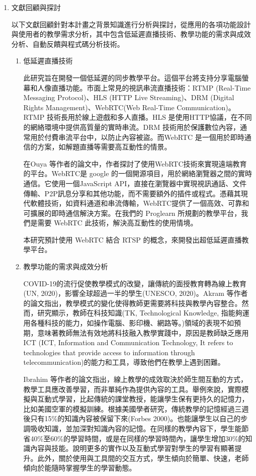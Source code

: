 \documentclass[12pt]{article}
\begin{document}
\begin{enumerate}
  \item 文獻回顧與探討
    \par 以下文獻回顧針對本計畫之背景知識進行分析與探討，從應用的各項功能設計與使用者的教學需求分析，其中包含低延遲直播技術、教學功能的需求與成效分析、自動反饋與程式碼分析技術。
    \begin{enumerate}
      \setlength{\parindent}{2em}
      \item 低延遲直播技術
        \par 此研究旨在開發一個低延遲的同步教學平台。這個平台將支持分享電腦螢幕和人像直播功能。市面上常見的視訊串流直播技術：RTMP (Real-Time Messaging Protocol)、HLS (HTTP Live Streaming)、DRM (Digital Rights Management)、WebRTC(Web Real-Time Communication)。RTMP 技術長用於線上遊戲和多人直播。HLS 是使用HTTP協議，在不同的網絡環境中提供高質量的實時串流。DRM 技術用於保護數位內容，通常用於付費串流平台中，以防止內容被盜。而WebRTC 是一個用於即時通信的方案，如解題直播等需要高互動性的情景。
        \par 在Ouya %
        等作者的論文中\cite{ref13}，作者探討了使用WebRTC技術來實現遠端教育的平台。WebRTC是 google 的一個開源項目，用於網絡瀏覽器之間的實時通信。它使用一個JavaScript API，直接在瀏覽器中實現視訊通話、文件傳輸、P2P訊息分享和其他功能，而不需要額外的插件或程式。憑藉其現代軟體技術，如資料通道和串流傳輸，WebRTC提供了一個高效、可靠和可擴展的即時通信解決方案。在我們的 Proglearn 所規劃的教學平台，我們是需要 WebRTC 此技術，解決高互動性的使用情境。
        \par 本研究預計使用 WebRTC 結合 RTSP 的概念，來開發出超低延遲直播教學平台。
      \item 教學功能的需求與成效分析
        \par COVID-19的流行促使教學模式的改變，讓傳統的面授教育轉為線上教育(UN, 2020)\cite{ref8}，影響全球超過一半的學生(UNESCO, 2020)\cite{ref9}。Akram %
        等作者的論文\cite{ref15}指出，教學模式的變化使得教師更需要將科技與教學內容整合。然而，研究顯示，教師在科技知識(TK, Technological Knowledge, 指能夠運用各種科技的能力，如操作電腦、影印機、網路等。)\cite{ref10}領域的表現不如預期，意味著教師無法有效地將科技融入教學實踐中，原因是教師缺乏應用ICT (ICT, Information and Communication Technology, It refers to technologies that provide access to information through telecommunication)\cite{ref11}的能力和工具，導致他們在教學上遇到困難。
        \par Ibrahim %
        等作者的論文\cite{ref14}指出，線上教學的成效取決於師生間互動的方式，教學工具應改善學習，而非單純作為提供內容的工具。舉例來說，實際模擬與互動式學習，比起傳統的課堂教授，能讓學生保有更持久的記憶力，比如美國空軍的模擬訓練。根據美國學者研究，傳統教學的記憶經過三週後只有15\%的知識內容被保留下來(Forbes 2000)\cite{ref12}。也能讓學生以自己的步調吸收知識，並加深對知識內容的記憶。在同樣的教學內容下，學生能節省40\%至60\%的學習時間，或是在同樣的學習時間內，讓學生增加30\%的知識內容與技能。說明更多的實作以及互動式學習對學生的學習有顯著提升。此外，關於使用與工具間的交互方式，學生傾向於簡單、快速，老師傾向於能隨時掌握學生的學習動態。

\end{enumerate}
\end{enumerate}
\end{document}

